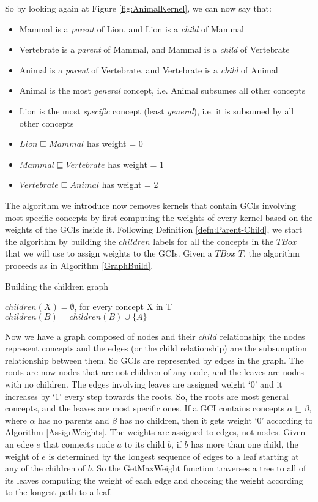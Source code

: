 So by looking again at Figure \ref{fig:AnimalKernel}, we can now say that:
\begin{itemize}
\item Mammal is a \textit{parent} of Lion, and Lion is a \textit{child} of Mammal
\item Vertebrate is a \textit{parent} of Mammal, and Mammal is a \textit{child} of Vertebrate
\item Animal is a \textit{parent} of Vertebrate, and Vertebrate is a \textit{child} of Animal
\item Animal is the most \textit{general} concept, i.e. Animal subsumes all other concepts
\item Lion is the most \textit{specific} concept (least \textit{general}), i.e. it is subsumed by all other concepts
\item $Lion \sqsubseteq Mammal$ has weight = 0
\item $Mammal \sqsubseteq Vertebrate$ has weight = 1
\item $Vertebrate \sqsubseteq Animal$ has weight = 2
\end{itemize}

The algorithm we introduce now removes kernels that contain GCIs involving most specific concepts by first computing the weights of every kernel based on the weights of the GCIs inside it. Following Definition \ref{defn:Parent-Child}, we start the algorithm by building the $children$ labels for all the concepts in the $TBox$ that we will use to assign weights to the GCIs. Given a $TBox$ $T$, the algorithm proceeds as in Algorithm \ref{GraphBuild}.

\begin{algorithm}
\caption{Building the children graph}
\label{GraphBuild}
\begin{algorithmic}[1]
\State $children(X) = \emptyset$, for every concept X in T 
\State $children(B) = children(B) \cup \{ A \}$
\EndFor
\EndFunction
\end{algorithmic}
\end{algorithm}

Now we have a graph composed of nodes and their $child$ relationship; the nodes represent concepts and the edges (or the child relationship) are the subsumption relationship between them. So GCIs are represented by edges in the graph. The roots are now nodes that are not children of any node, and the leaves are nodes with no children. The edges involving leaves are assigned weight `0' and it increases by `1' every step towards the roots. So, the roots are most general concepts, and the leaves are most specific ones. If a GCI contains concepts $\alpha \sqsubseteq \beta$, where $\alpha$ has no parents and $\beta$ has no children, then it gets weight `0' according to Algorithm \ref{AssignWeights}. The weights are assigned to edges, not nodes. Given an edge $e$ that connects node $a$ to its child $b$, if $b$ has more than one child, the weight of $e$ is determined by the longest sequence of edges to a leaf starting at any of the children of $b$. So the GetMaxWeight function traverses a tree to all of its leaves computing the weight of each edge and choosing the weight according to the longest path to a leaf.

